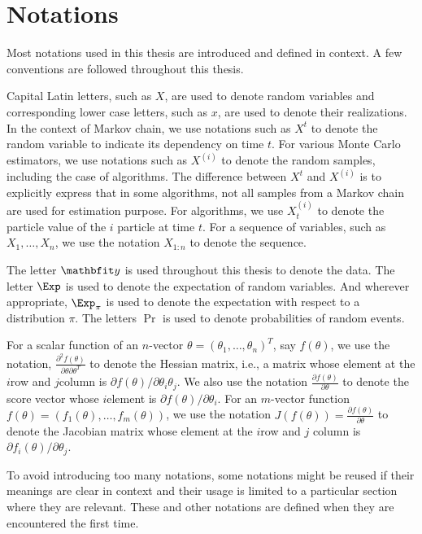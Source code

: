 \section{Notations}
\label{sec:Notations}

Most notations used in this thesis are introduced and defined in context. A
few conventions are followed throughout this thesis.

Capital Latin letters, such as $X$, are used to denote random variables and
corresponding lower case letters, such as $x$, are used to denote their
realizations. In the context of Markov chain, we use notations such as $X^t$
to denote the random variable to indicate its dependency on time $t$. For
various Monte Carlo estimators, we use notations such as $X^{(i)}$ to denote
the random samples, including the case of \mcmc algorithms. The difference
between $X^t$ and $X^{(i)}$ is to explicitly express that in some algorithms,
not all samples from a Markov chain are used for estimation purpose. For \smc
algorithms, we use $X_t^{(i)}$ to denote the particle value of the $i$\xth
particle at time $t$. For a sequence of variables, such as $X_1,\dots,X_n$,
we use the notation $X_{1:n}$ to denote the sequence.

The letter $\data$ is used throughout this thesis to denote the data. The
letter $\Exp$ is used to denote the expectation of random variables. And
wherever appropriate, $\Exp_{\pi}$ is used to denote the expectation with
respect to a distribution $\pi$. The letters $\Pr$ is used to denote
probabilities of random events.

For a scalar function of an $n$-vector $\theta = (\theta_1,\dots,\theta_n)^T$,
say $f(\theta)$, we use the notation,
  $\frac{\partial^2 f(\theta)}{\partial\theta\partial\theta^T}$
to denote the Hessian matrix, i.e., a matrix whose element at the $i$\xth row
and $j$\xth column is $\partial f(\theta)/\partial\theta_i\theta_j$. We also
use the notation $\frac{\partial f(\theta)}{\partial\theta}$
to denote the score vector whose $i$\xth element is $\partial
f(\theta)/\partial\theta_i$. For an $m$-vector function $f(\theta) =
(f_1(\theta),\dots,f_m(\theta))$, we use the notation
  $J(f(\theta)) = \frac{\partial f(\theta)}{\partial\theta}$
to denote the Jacobian matrix whose element at the $i$\xth row and $j$\xth
column is $\partial f_i(\theta)/\partial\theta_j$.

To avoid introducing too many notations, some notations might be reused if
their meanings are clear in context and their usage is limited to a
particular section where they are relevant. These and other notations are
defined when they are encountered the first time.

